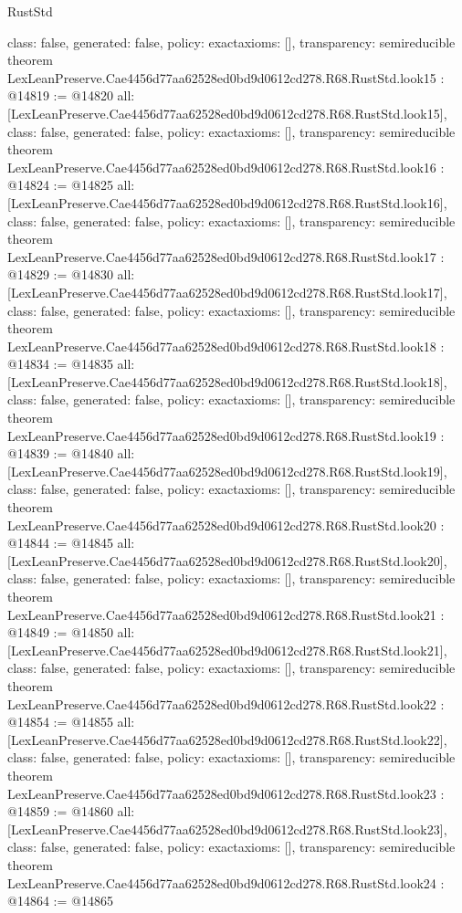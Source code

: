 \begin{lexlean}{RustStd}
\begin{coremodule}
{  class: false,
  generated: false,
  policy: exact{axioms: []},
  transparency: semireducible
}
theorem LexLeanPreserve.Cae4456d77aa62528ed0bd9d0612cd278.R68.RustStd.look15 : @14819 := @14820 {
  all: [LexLeanPreserve.Cae4456d77aa62528ed0bd9d0612cd278.R68.RustStd.look15],
  class: false,
  generated: false,
  policy: exact{axioms: []},
  transparency: semireducible
}
theorem LexLeanPreserve.Cae4456d77aa62528ed0bd9d0612cd278.R68.RustStd.look16 : @14824 := @14825 {
  all: [LexLeanPreserve.Cae4456d77aa62528ed0bd9d0612cd278.R68.RustStd.look16],
  class: false,
  generated: false,
  policy: exact{axioms: []},
  transparency: semireducible
}
theorem LexLeanPreserve.Cae4456d77aa62528ed0bd9d0612cd278.R68.RustStd.look17 : @14829 := @14830 {
  all: [LexLeanPreserve.Cae4456d77aa62528ed0bd9d0612cd278.R68.RustStd.look17],
  class: false,
  generated: false,
  policy: exact{axioms: []},
  transparency: semireducible
}
theorem LexLeanPreserve.Cae4456d77aa62528ed0bd9d0612cd278.R68.RustStd.look18 : @14834 := @14835 {
  all: [LexLeanPreserve.Cae4456d77aa62528ed0bd9d0612cd278.R68.RustStd.look18],
  class: false,
  generated: false,
  policy: exact{axioms: []},
  transparency: semireducible
}
theorem LexLeanPreserve.Cae4456d77aa62528ed0bd9d0612cd278.R68.RustStd.look19 : @14839 := @14840 {
  all: [LexLeanPreserve.Cae4456d77aa62528ed0bd9d0612cd278.R68.RustStd.look19],
  class: false,
  generated: false,
  policy: exact{axioms: []},
  transparency: semireducible
}
theorem LexLeanPreserve.Cae4456d77aa62528ed0bd9d0612cd278.R68.RustStd.look20 : @14844 := @14845 {
  all: [LexLeanPreserve.Cae4456d77aa62528ed0bd9d0612cd278.R68.RustStd.look20],
  class: false,
  generated: false,
  policy: exact{axioms: []},
  transparency: semireducible
}
theorem LexLeanPreserve.Cae4456d77aa62528ed0bd9d0612cd278.R68.RustStd.look21 : @14849 := @14850 {
  all: [LexLeanPreserve.Cae4456d77aa62528ed0bd9d0612cd278.R68.RustStd.look21],
  class: false,
  generated: false,
  policy: exact{axioms: []},
  transparency: semireducible
}
theorem LexLeanPreserve.Cae4456d77aa62528ed0bd9d0612cd278.R68.RustStd.look22 : @14854 := @14855 {
  all: [LexLeanPreserve.Cae4456d77aa62528ed0bd9d0612cd278.R68.RustStd.look22],
  class: false,
  generated: false,
  policy: exact{axioms: []},
  transparency: semireducible
}
theorem LexLeanPreserve.Cae4456d77aa62528ed0bd9d0612cd278.R68.RustStd.look23 : @14859 := @14860 {
  all: [LexLeanPreserve.Cae4456d77aa62528ed0bd9d0612cd278.R68.RustStd.look23],
  class: false,
  generated: false,
  policy: exact{axioms: []},
  transparency: semireducible
}
theorem LexLeanPreserve.Cae4456d77aa62528ed0bd9d0612cd278.R68.RustStd.look24 : @14864 := @14865 {
}
\end{coremodule}
\end{lexlean}
